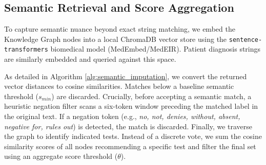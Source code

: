 \documentclass[pmlr]{jmlr}%
\begin{document}
\subsection*{Semantic Retrieval and Score Aggregation}
\label{app:semantic_matching}
To capture semantic nuance beyond exact string matching, we embed the Knowledge Graph nodes into a local ChromaDB vector store using the \texttt{sentence-transformers} biomedical model (MedEmbed/MedEIR). Patient diagnosis strings are similarly embedded and queried against this space.

As detailed in Algorithm \ref{alg:semantic_imputation}, we convert the returned vector distances to cosine similarities. Matches below a baseline semantic threshold ($s_{min}$) are discarded. Crucially, before accepting a semantic match, a heuristic negation filter scans a six-token window preceding the matched label in the original text. If a negation token (e.g., \textit{no, not, denies, without, absent, negative for, rules out}) is detected, the match is discarded. Finally, we traverse the graph to identify indicated tests. Instead of a discrete vote, we sum the cosine similarity scores of all nodes recommending a specific test and filter the final set using an aggregate score threshold ($\theta$).
\end{document}
